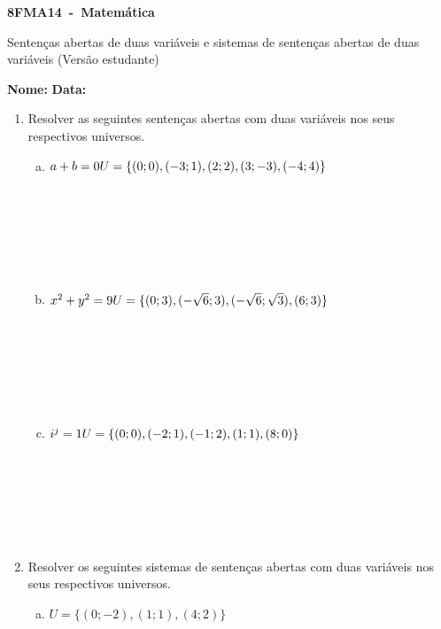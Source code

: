 \documentclass[a4paper,14pt]{article}
\begin{document}
	
	\noindent\textbf{8FMA14~-~Matemática} 
	
	\begin{center}Sentenças abertas de duas variáveis e sistemas de sentenças abertas de duas variáveis (Versão estudante)
	\end{center}
	
	
	\noindent\textbf{Nome:} \underline{\hspace{10cm}}
	\noindent\textbf{Data:} \underline{\hspace{4cm}}
	
	
	\begin{multicols}{2}
	    \begin{enumerate}
	    	\item Resolver as seguintes sentenças abertas com duas variáveis nos seus respectivos universos.
	    	\begin{enumerate}[a)]
	    		\item $a+b=0\\
	    		U=\{(0; 0),(-3;1),\\
	    		(2;2),(3;-3),(-4;4)\}$\\\\\\\\\\\\\\
	    		\item $x^2+y^2=9\\
	    		U=\{(0;3),(-\sqrt{6};3),\\
	    		(-\sqrt{6};\sqrt{3}),(6;3)\}$\\\\\\\\\\\\\\
	    		\item $i^j=1\\
	    		U=\{(0;0),(-2;1),(-1;2),
	    		\\(1;1),(8;0)\}$\\\\\\\\\\\\\\
	    	\end{enumerate}
    	    \item Resolver os seguintes sistemas de sentenças abertas com duas variáveis nos seus respectivos universos.
    	    \begin{enumerate}[a)]
    	    	\item $U = \{(0;-2),(1;1),(4;2)\}$
    	    	

\end{enumerate}
\end{enumerate}
\end{multicols}
\end{document}
